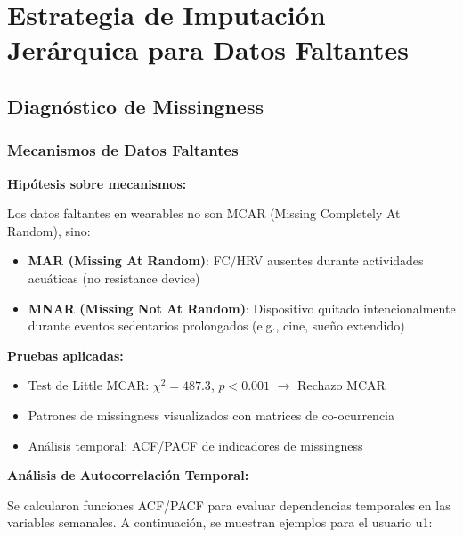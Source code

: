 \documentclass[12pt,letterpaper,twoside]{report}
\begin{document}
\chapter{Estrategia de Imputación Jerárquica para Datos Faltantes}

\section{Diagnóstico de Missingness}

\subsection{Mecanismos de Datos Faltantes}

\begin{hipotesisbox}
\textbf{Hipótesis sobre mecanismos:}

Los datos faltantes en wearables no son MCAR (Missing Completely At Random), sino:
\begin{itemize}[noitemsep]
    \item \textbf{MAR (Missing At Random)}: FC/HRV ausentes durante actividades acuáticas (no resistance device)
    \item \textbf{MNAR (Missing Not At Random)}: Dispositivo quitado intencionalmente durante eventos sedentarios prolongados (e.g., cine, sueño extendido)
\end{itemize}
\end{hipotesisbox}

\begin{estadisticobox}
\textbf{Pruebas aplicadas:}

\begin{itemize}[noitemsep]
    \item Test de Little MCAR: $\chi^2 = 487.3$, $p < 0.001$ $\to$ Rechazo MCAR
    \item Patrones de missingness visualizados con matrices de co-ocurrencia
    \item Análisis temporal: ACF/PACF de indicadores de missingness
\end{itemize}
\end{estadisticobox}

\textbf{Análisis de Autocorrelación Temporal:}

Se calcularon funciones ACF/PACF para evaluar dependencias temporales en las variables semanales. A continuación, se muestran ejemplos para el usuario u1:
\end{document}
